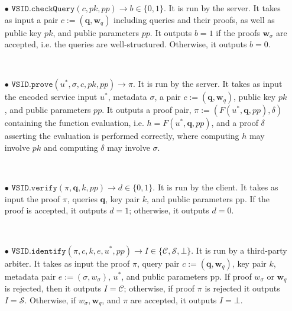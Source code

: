 \begin{definition}
\begin{itemize}



\

\item[$\bullet$] $\mathtt{VSID.checkQuery}(c, pk,{pp})\rightarrow b\in\{0,1\}$. It is run by the server. It takes as input a pair $c:=(\bm{q}, \bm{w}_{\scriptscriptstyle q})$ including queries and their proofs, as well as public key $pk$, and {public parameters $pp$}. It outputs $b = 1$ if the proofs $\bm{w}_{\scriptscriptstyle\sigma}$ are accepted, i.e. the queries are well-structured. Otherwise, it outputs $b = 0$.

\

\item[$\bullet$] $\mathtt{VSID.prove}(u^{\scriptscriptstyle *},\sigma,c,pk, { pp})\rightarrow \pi$. It is run by the server. It takes as input the  encoded service input $u^{\scriptscriptstyle *}$, metadata $\sigma$, a pair $c:=(\bm{q},\bm{w}_{\scriptscriptstyle q})$,  public key $pk$, and { public parameters $pp$}. It outputs a proof pair, $\pi:=(F(u^{\scriptscriptstyle *},\bm{q},{ pp}),\delta)$ containing the function evaluation, i.e. $h=F(u^{\scriptscriptstyle *},\bm{q},{ pp})$, and a proof $\delta$ asserting the evaluation is performed correctly, where computing $h$ may involve $pk$ and computing $\delta$ may involve $\sigma$.


\

\item[$\bullet$] $\mathtt{VSID.verify}(\pi, \bm{q}, k, { pp})\rightarrow d\in\{0,1\}$. It is run by the client. It takes as input the proof $\pi$, queries $\bm{q}$,  key pair $k$, and  { public parameters pp}. If the proof is accepted, it outputs $d=1$; otherwise, it outputs $d=0$. 

\

\item[$\bullet$]  $\mathtt{VSID.identify}(\pi,c,k,e,u^{\scriptscriptstyle *}, { pp})\rightarrow I\in \{ \mathcal{C},\mathcal{S},\bot\}$. It is run by a third-party arbiter. It takes as input the proof $\pi$, query pair $c:=(\bm{q},\bm{w}_{\scriptscriptstyle q})$,  key pair $k$, metadata pair  $e:=(\sigma,w_{\sigma})$,  $u^{\scriptscriptstyle *}$, and { public parameters pp}. If   proof $w_{\scriptscriptstyle\sigma}$ or $\bm{w}_{\scriptscriptstyle q}$  is rejected, then it outputs $I=\mathcal C$; otherwise, if proof $\pi$ is rejected it outputs $I=\mathcal S$.  Otherwise, if  $w_{\scriptscriptstyle\sigma}, \bm{w}_{\scriptscriptstyle q}$, and $\pi$ are accepted, it outputs   $I=\bot$. 



\end{itemize}
\end{definition}


